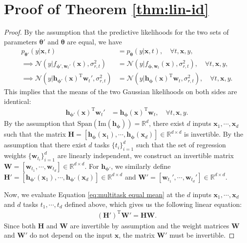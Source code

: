 \documentclass[10pt]{article} %
\theoremstyle{plain}
\theoremstyle{definition}
\begin{document}
\section{Proof of Theorem \ref{thm:lin-id}}\label{appendix:proof-lin-id}
\begin{proof}
    By the assumption that the predictive likelihoods for the two sets of parameters $\boldsymbol{\theta}'$ and $\boldsymbol{\theta}$ are equal, we have
    \begin{align}
        p_{\boldsymbol{\theta}'}(y|\mathbf{x},t)&=p_{\boldsymbol{\theta}}(y|\mathbf{x},t),\quad\forall t,\mathbf{x},y,\\
        \implies\mathcal{N}(y|f_{\boldsymbol{\phi}',\mathbf{w}_t'}(\mathbf{x}),\sigma_{r,t}^2) &= \mathcal{N}(y|f_{\boldsymbol{\phi},\mathbf{w}_t}(\mathbf{x}),\sigma_{r,t}^2),\quad\forall t,\mathbf{x},y,\\
        \implies \mathcal{N}(y|\mathbf{h}_{\boldsymbol{\phi}'}(\mathbf{x})^{\text{T}}\mathbf{w}_{t}',\sigma_{r,t}^2) &= \mathcal{N}(y|\mathbf{h}_{\boldsymbol{\phi}}(\mathbf{x})^{\text{T}}\mathbf{w}_{t},\sigma_{r,t}^2),\quad\forall t,\mathbf{x},y.
    \end{align}
    This implies that the means of the two Gaussian likelihoods on both sides are identical:
    \begin{align}\label{eq:multitask equal mean}
        \mathbf{h}_{\boldsymbol{\phi}'}(\mathbf{x})^{\text{T}}\mathbf{w}_{t}' &= \mathbf{h}_{\boldsymbol{\phi}}(\mathbf{x})^{\text{T}}\mathbf{w}_t,\quad\forall t,\mathbf{x},y.
    \end{align}
    By the assumption that $\text{Span}(\text{Im}(\mathbf{h}_{\boldsymbol{\phi}}))=\mathbb{R}^d$, there exist $d$ inputs $\mathbf{x}_1,\cdots,\mathbf{x}_d$ such that the matrix $\mathbf{H}=[\mathbf{h}_{\boldsymbol{\phi}}(\mathbf{x}_1),\cdots,\mathbf{h}_{\boldsymbol{\phi}}(\mathbf{x}_d)]\in\mathbb{R}^{d\times d}$ is invertible. 
    By the assumption that there exist $d$ tasks $\{t_i\}_{i=1}^d$ such that the set of regression weights $\{\mathbf{w}_{t_i}\}_{i=1}^d$ are linearly independent, we construct an invertible matrix $\mathbf{W}=[\mathbf{w}_{t_1},\cdots,\mathbf{w}_{t_d}]\in\mathbb{R}^{d\times d}$.
    For $\mathbf{h}_{\boldsymbol{\phi}'}$, we similarly define $\mathbf{H}'=[\mathbf{h}_{\boldsymbol{\phi}'}(\mathbf{x}_1),\cdots,\mathbf{h}_{\boldsymbol{\phi}'}(\mathbf{x}_d)]\in\mathbb{R}^{d\times d}$ and $\mathbf{W}'=[\mathbf{w}_{t_1}',\cdots,\mathbf{w}_{t_d}']\in\mathbb{R}^{d\times d}$.
    
    Now, we evaluate Equation \eqref{eq:multitask equal mean} at the $d$ inputs $\mathbf{x}_1,\cdots,\mathbf{x}_d$ and $d$ tasks $t_1,\cdots,t_d$ defined above, which gives us the following linear equation:
    \begin{align}
        (\mathbf{H}')^{\text{T}}\mathbf{W}'=\mathbf{H}\mathbf{W}.
    \end{align}
    Since both $\mathbf{H}$ and $\mathbf{W}$ are invertible by assumption and the weight matrices $\mathbf{W}$ and $\mathbf{W}'$ do not depend on the input $\mathbf{x}$, the matrix $\mathbf{W}'$ must be invertible.


\end{proof}
\end{document}
